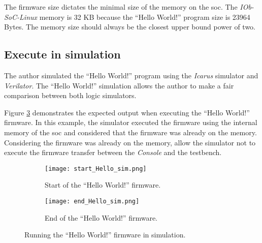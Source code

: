 The firmware size dictates the minimal size of the memory on the \acrshort{soc}. The \textit{IOb-SoC-Linux} memory is 32 KB because the \enquote{Hello World!} program size is 23964 Bytes. The memory size should always be the closest upper bound power of two.

\subsection{Execute in simulation}
The author simulated the \enquote{Hello World!} program using the \textit{Icarus} simulator and \textit{Verilator}. The \enquote{Hello World!} simulation allows the author to make a fair comparison between both logic simulators.

Figure \ref{fig:hello_sim} demonstrates the expected output when executing the \enquote{Hello World!} firmware. In this example, the simulator executed the firmware using the internal memory of the \acrshort{soc} and considered that the firmware was already on the memory. Considering the firmware was already on the memory, allow the simulator not to execute the firmware transfer between the \textit{Console} and the testbench.

\begin{figure}[!ht]
    \centering
    \begin{subfigure}[b]{0.49\textwidth}
        \centering
        \texttt{[image: start\_Hello\_sim.png]}
        \caption{Start of the \enquote{Hello World!} firmware.}
        \label{fig:start_hello_sim}
    \end{subfigure}
    \hfill
    \begin{subfigure}[b]{0.49\textwidth}
        \centering
        \texttt{[image: end\_Hello\_sim.png]}
        \caption{End of the \enquote{Hello World!} firmware.}
        \label{fig:end_hello_sim}
    \end{subfigure}
    \caption{Running the \enquote{Hello World!} firmware in simulation.}
    \label{fig:hello_sim}
\end{figure}

